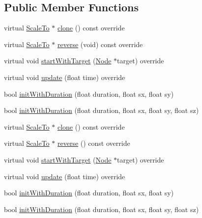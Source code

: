 \subsection*{Public Member Functions}
\begin{DoxyCompactItemize}
\item 
virtual \hyperlink{classScaleTo}{Scale\+To} $\ast$ \hyperlink{classScaleTo_a02707ca35819eabf4cc14909fec9a348}{clone} () const override
\item 
virtual \hyperlink{classScaleTo}{Scale\+To} $\ast$ \hyperlink{classScaleTo_a511d41e9e8a8b2ad3a751bb455912c03}{reverse} (void) const override
\item 
virtual void \hyperlink{classScaleTo_a2591cf6fc3d966d7799bac46acce04d7}{start\+With\+Target} (\hyperlink{classNode}{Node} $\ast$target) override
\item 
virtual void \hyperlink{classScaleTo_ac3678e85987891e4cc2e9d612569541c}{update} (float time) override
\item 
bool \hyperlink{classScaleTo_ab9b91e0f4ecfc3fad18cb4f929bd5e18}{init\+With\+Duration} (float duration, float sx, float sy)
\item 
bool \hyperlink{classScaleTo_aff69915e68ddbaa502d82a72e5787bf8}{init\+With\+Duration} (float duration, float sx, float sy, float sz)
\item 
virtual \hyperlink{classScaleTo}{Scale\+To} $\ast$ \hyperlink{classScaleTo_a5e7104838e1989eb1f301468ebd0ffe7}{clone} () const override
\item 
virtual \hyperlink{classScaleTo}{Scale\+To} $\ast$ \hyperlink{classScaleTo_a78b1925960230dcae45724ceecf62b20}{reverse} () const override
\item 
virtual void \hyperlink{classScaleTo_ae2f7b7aaaf43d55a2c5bdce80d02887c}{start\+With\+Target} (\hyperlink{classNode}{Node} $\ast$target) override
\item 
virtual void \hyperlink{classScaleTo_ad02fb28920bffb05ba31ed1b92c70ef9}{update} (float time) override
\item 
bool \hyperlink{classScaleTo_ab9b91e0f4ecfc3fad18cb4f929bd5e18}{init\+With\+Duration} (float duration, float sx, float sy)
\item 
bool \hyperlink{classScaleTo_aff69915e68ddbaa502d82a72e5787bf8}{init\+With\+Duration} (float duration, float sx, float sy, float sz)
\end{DoxyCompactItemize}
